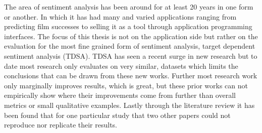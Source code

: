

The area of sentiment analysis has been around for at least 20 years in one form or another. In which it has had many and varied applications ranging from predicting film successes to selling it as a tool through application programming interfaces. The focus of this thesis is not on the application side but rather on the evaluation for the most fine grained form of sentiment analysis, target dependent sentiment analysis (TDSA). TDSA has seen a recent surge in new research but to date most research only evaluates on very similar, datasets which limits the conclusions that can be drawn from these new works. Further most research work only marginally improves results, which is great, but these prior works can not empirically show where their improvements come from further than overall metrics or small qualitative examples. Lastly through the literature review it has been found that for one particular study that two other papers could not reproduce nor replicate their results.

